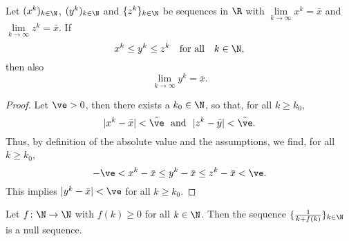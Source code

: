 { 
\begin{frame} 
~\\[-15pt]
\begin{theo}
	Let $(x^k)_{k\in \N}$, $(y^k)_{k\in \N}$ and $\{z^k\}_{k\in \N}$ be sequences in $\R$ with $\lim\limits_{k\to\infty}x^k= \bar{x}$ and $\lim\limits_{k\to\infty}z^k= \bar{x}$. If 
	$$x^k \leq y^k \leq z^k~~~\text{for all}~~~k\in\N,$$
	then also
	$$\lim\limits_{k\to\infty}y^k= \bar{x}.$$
\end{theo}
\begin{proof}\blank
	Let $\ve > 0$, then there exists a $k_0 \in \N$, so that, for all $k \geq k_0$,
	$$|x^k-\bar{x}| <  \tilde{\ve} ~~\text{and}~~|z^k-\bar{y}| <  \tilde{\ve}.$$
	Thus, by definition of the absolute value and the assumptions, we find, for all $k \geq k_0$,
	$$-\ve < x^k-\bar{x} \leq y^k-\bar{x} \leq z^k- \bar{x} < \ve .$$
	This implies $|y^k - \bar{x}|< \ve$ for all $k \geq k_0$.
\end{proof}
 \end{frame}
\begin{frame} 
\begin{ex}\blank
	Let $f\colon \N \to \N$ with $f(k) \geq 0$ for all $k \in \N$. Then the sequence $\{\frac{1}{k + f(k)}\}_{k\in \N}$ is a null sequence.
\end{ex}
 \end{frame}
}


